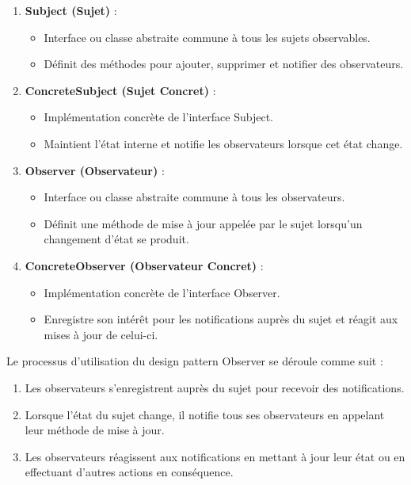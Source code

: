 \documentclass[french]{article}
\begin{document}
\begin{enumerate}
    \item \textbf{Subject (Sujet)} :
    \begin{itemize}
        \item Interface ou classe abstraite commune à tous les sujets observables.
        \item Définit des méthodes pour ajouter, supprimer et notifier des observateurs.
    \end{itemize}
    
    \item \textbf{ConcreteSubject (Sujet Concret)} :
    \begin{itemize}
        \item Implémentation concrète de l'interface Subject.
        \item Maintient l'état interne et notifie les observateurs lorsque cet état change.
    \end{itemize}
    
    \item \textbf{Observer (Observateur)} :
    \begin{itemize}
        \item Interface ou classe abstraite commune à tous les observateurs.
        \item Définit une méthode de mise à jour appelée par le sujet lorsqu'un changement d'état se produit.
    \end{itemize}
    
    \item \textbf{ConcreteObserver (Observateur Concret)} :
    \begin{itemize}
        \item Implémentation concrète de l'interface Observer.
        \item Enregistre son intérêt pour les notifications auprès du sujet et réagit aux mises à jour de celui-ci.
    \end{itemize}
\end{enumerate}

Le processus d'utilisation du design pattern Observer se déroule comme suit :

\begin{enumerate}
    \item Les observateurs s'enregistrent auprès du sujet pour recevoir des notifications.
    \item Lorsque l'état du sujet change, il notifie tous ses observateurs en appelant leur méthode de mise à jour.
    \item Les observateurs réagissent aux notifications en mettant à jour leur état ou en effectuant d'autres actions en conséquence.
\end{enumerate}
\end{document}
